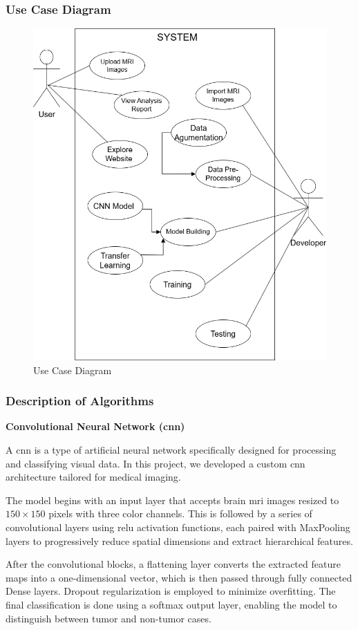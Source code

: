 \subsubsection{Use Case Diagram}
\begin{figure}[H]
    \centering
    \includegraphics[width=0.85\linewidth]{Images/use.png}
    \caption{Use Case Diagram}
    \label{fig:Use Case Diagram}
\end{figure}
\subsubsection{Description of Algorithms}

\textbf{Convolutional Neural Network (\gls{cnn})}

A \gls{cnn} is a type of artificial neural network specifically designed for processing and classifying visual data. In this project, we developed a custom \gls{cnn} architecture tailored for medical imaging.

The model begins with an input layer that accepts brain \gls{mri} images resized to $150 \times 150$ pixels with three color channels. This is followed by a series of convolutional layers using \gls{relu} activation functions, each paired with MaxPooling layers to progressively reduce spatial dimensions and extract hierarchical features.

After the convolutional blocks, a flattening layer converts the extracted feature maps into a one-dimensional vector, which is then passed through fully connected Dense layers. Dropout regularization is employed to minimize overfitting. The final classification is done using a softmax output layer, enabling the model to distinguish between tumor and non-tumor cases.

